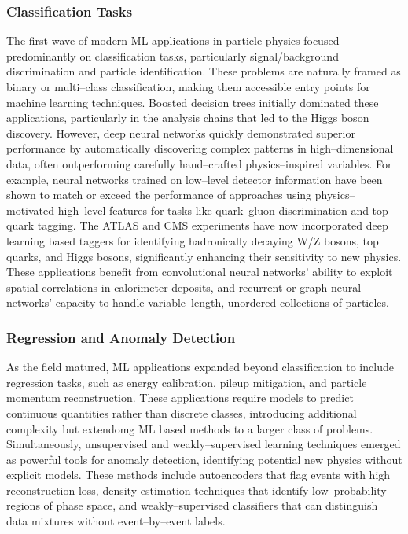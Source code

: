 \subsubsection{Classification Tasks}
The first wave of modern ML applications in particle physics focused predominantly on classification tasks, particularly signal/background discrimination and particle identification.
%
These problems are naturally framed as binary or multi--class classification, making them accessible entry points for machine learning techniques.
%
Boosted decision trees initially dominated these applications, particularly in the analysis chains that led to the Higgs boson discovery.
%
However, deep neural networks quickly demonstrated superior performance by automatically discovering complex patterns in high--dimensional data, often outperforming carefully hand--crafted physics--inspired variables.
%
For example, neural networks trained on low--level detector information have been shown to match or exceed the performance of approaches using physics--motivated high--level features for tasks like quark--gluon discrimination and top quark tagging.
%
The ATLAS and CMS experiments have now incorporated deep learning based taggers for identifying hadronically decaying W/Z bosons, top quarks, and Higgs bosons, significantly enhancing their sensitivity to new physics.
%
These applications benefit from convolutional neural networks' ability to exploit spatial correlations in calorimeter deposits, and recurrent or graph neural networks' capacity to handle variable--length, unordered collections of particles.

\subsubsection{Regression and Anomaly Detection}
As the field matured, ML applications expanded beyond classification to include regression tasks, such as energy calibration, pileup mitigation, and particle momentum reconstruction.
%
These applications require models to predict continuous quantities rather than discrete classes, introducing additional complexity but extendomg ML based methods to a larger class of problems.
%
Simultaneously, unsupervised and weakly--supervised learning techniques emerged as powerful tools for anomaly detection, identifying potential new physics without explicit models.
%
These methods include autoencoders that flag events with high reconstruction loss, density estimation techniques that identify low--probability regions of phase space, and weakly--supervised classifiers that can distinguish data mixtures without event--by--event labels.

